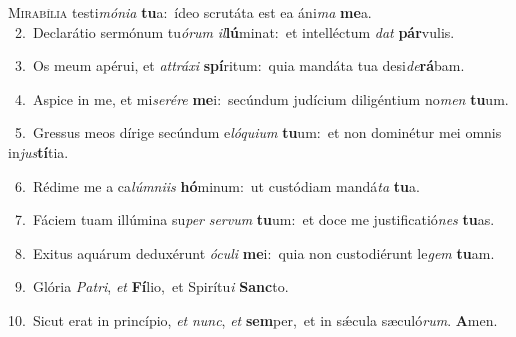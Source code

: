 \lettrine{\initial\textcolor{\initialcolor}{M}}{irabília} testi\-\textit{mó}\-\textit{ni}\textit{a} \textbf{tu}\-a:~\star ídeo scrutáta est ea áni\textit{ma} \textbf{me}\-a.\\
{\numbfont\textcolor{\numbcolor}{~2.}}~Declarátio sermónum tu\-\textit{ó}\-\textit{rum} \textit{il}\-\textbf{lú}minat:~\star et intelléctum \textit{dat} \textbf{pár}\-vulis.\par
{\numbfont\textcolor{\numbcolor}{~3.}}~Os meum apérui, et \textit{at}\-\textit{trá}\textit{xi} \textbf{spí}\-ritum:~\star quia mandáta tua desi\-\textit{de}\-\textbf{rá}bam.\par
{\numbfont\textcolor{\numbcolor}{~4.}}~Aspice in me, et mi\-\textit{se}\-\textit{ré}\textit{re} \textbf{me}\-i:~\star secúndum judícium diligéntium no\textit{men} \textbf{tu}\-um.\par
{\numbfont\textcolor{\numbcolor}{~5.}}~Gressus meos dírige secúndum e\-\textit{ló}\-\textit{qui}\textit{um} \textbf{tu}\-um:~\star et non dominétur mei omnis in\-\textit{jus}\-\textbf{tí}tia.\par
{\numbfont\textcolor{\numbcolor}{~6.}}~Rédime me a ca\-\textit{lúm}\-\textit{ni}\textit{is} \textbf{hó}\-minum:~\star ut custódiam mandá\textit{ta} \textbf{tu}\-a.\par
{\numbfont\textcolor{\numbcolor}{~7.}}~Fáciem tuam illúmina su\textit{per} \textit{ser}\-\textit{vum} \textbf{tu}\-um:~\star et doce me justificatió\textit{nes} \textbf{tu}\-as.\par
{\numbfont\textcolor{\numbcolor}{~8.}}~Exitus aquárum deduxérunt \textit{ó}\-\textit{cu}\textit{li} \textbf{me}\-i:~\star quia non custodiérunt le\textit{gem} \textbf{tu}\-am.\par
{\numbfont\textcolor{\numbcolor}{~9.}}~Glória \textit{Pa}\-\textit{tri}, \textit{et} \textbf{Fí}\-lio,~\star et Spirítu\textit{i} \textbf{Sanc}\-to.\par
{\numbfont\textcolor{\numbcolor}{10.}}~Sicut erat in princípio, \textit{et} \textit{nunc}\-, \textit{et} \textbf{sem}\-per,~\star et in sǽcula sæculó\-\textit{rum}\-. \textbf{A}\-men.\par
